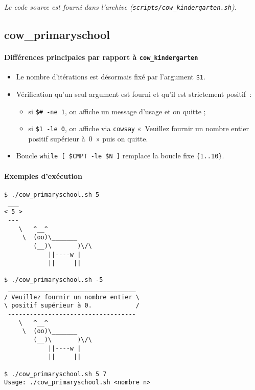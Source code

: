 \documentclass[a4paper,french,11pt]{article}
\begin{document}
\medskip
\noindent\emph{Le code source est fourni dans l’archive (\texttt{scripts/cow\_kindergarten.sh}).}

\newpage

\subsection{cow\_primaryschool}

\paragraph{Différences principales par rapport à \texttt{cow\_kindergarten}}  
\begin{itemize}
  \item Le nombre d’itérations est désormais fixé par l’argument \texttt{\$1}.  
  \item Vérification qu’un seul argument est fourni et qu’il est strictement positif :
    \begin{itemize}
      \item si \texttt{\$\# -ne 1}, on affiche un message d’usage et on quitte ;
      \item si \texttt{\$1 -le 0}, on affiche via \texttt{cowsay} « Veuillez fournir un nombre entier positif supérieur à 0 » puis on quitte.
    \end{itemize}
  \item Boucle \texttt{while [ \$CMPT -le \$N ]} remplace la boucle fixe \texttt{\{1..10\}}.
\end{itemize}

\paragraph{Exemples d’exécution}  
\begin{verbatim}
$ ./cow_primaryschool.sh 5
 ___
< 5 >
 ---
    \   ^__^
     \  (oo)\_______
        (__)\       )\/\
            ||----w |
            ||     ||

$ ./cow_primaryschool.sh -5
 ___________________________________
/ Veuillez fournir un nombre entier \
\ positif supérieur à 0.            /
 -----------------------------------
    \   ^__^
     \  (oo)\_______
        (__)\       )\/\
            ||----w |
            ||     ||

$ ./cow_primaryschool.sh 5 7
Usage: ./cow_primaryschool.sh <nombre n>
\end{verbatim}
\end{document}
